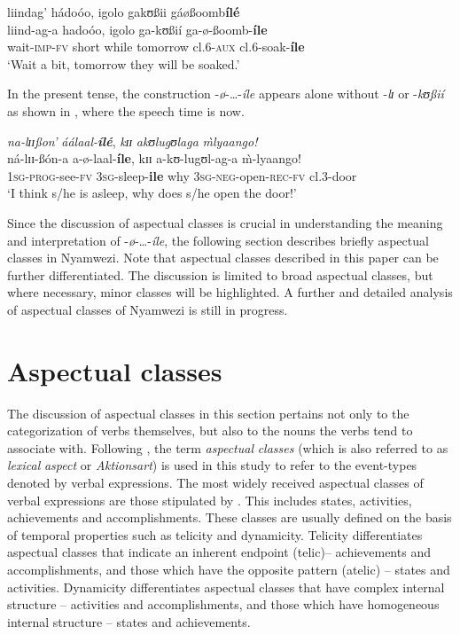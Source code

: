 \documentclass[output=paper,newtxmath,modfonts,nonflat,draftmode]{langsci/langscibook}
\begin{document}
\ea \label{ex:kanijo:6}
\glll liindag’        hádoóo,      igolo         gakʊßii   gáøßoomb\textbf{ílé}\\
liind-ag-a     hadoóo,      igolo         ga-kʊßií  ga-ø-ßoomb-\textbf{íle}\\
wait-\textsc{imp}-\textsc{fv} short while tomorrow cl.\textsc{6-aux} cl.\textsc{6}-soak-\textbf{íle}\\
\glt ‘Wait a bit, tomorrow they will be soaked.’
\z


In the present tense, the construction -\textit{ø}-\ldots-\textit{íle} appears alone without -\textit{l}{\textit{ɪ}} or -\textit{kʊßií} as shown in , where the speech time is now. 

\ea \label{ex:kanijo:7}
\glll \textit{na-lɪɪ}\textit{ßon’}           \textit{áálaal-}\textbf{\textit{ílé}},    \textit{k}{\textit{ɪɪ}} \textit{akʊ}\textit{lugʊlaga}              \textit{\`{m}lyaango!}\\
ná-lɪɪ-ßón-a           a-ø-laal-\textbf{íle},   kɪɪ  a-kʊ-lugʊl-ag-a            \`{m}-lyaango!\\
\textsc{1sg}-\textsc{prog}-see-\textsc{fv} \textsc{3sg}-sleep-\textbf{ile} why \textsc{3sg}-\textsc{neg}-open-\textsc{rec}-\textsc{fv} cl.3-door\\
\glt ‘I think s/he is asleep, why does s/he open the door!’
\z

Since the discussion of aspectual classes is crucial in understanding the meaning and interpretation of -\textit{ø}-…-\textit{íle}, the following section describes briefly aspectual classes in Nyamwezi. Note that aspectual classes described in this paper can be further differentiated. The discussion is limited to broad aspectual classes, but where necessary, minor classes will be highlighted. A further and detailed analysis of aspectual classes of Nyamwezi is still in progress. 


\section{Aspectual classes}
\label{sec:kanijo:3}

The discussion of aspectual classes in this section pertains not only to the categorization of verbs themselves, but also to the nouns the verbs tend to associate with. Following \citet[1]{Rothstein2004}, the term \textit{aspectual} \textit{classes} (which is also referred to as \textit{lexical} \textit{aspect} or \textit{Aktionsart}) is used in this study to refer to the event-types denoted by verbal expressions. The most widely received aspectual classes of verbal expressions are those stipulated by \citet{Vendler1957}. This includes states, activities, achievements and accomplishments. These classes are usually defined on the basis of temporal properties such as telicity and dynamicity. Telicity differentiates aspectual classes that indicate an inherent endpoint (telic)-- achievements and accomplishments, and those which have the opposite pattern (atelic) -- states and activities. Dynamicity differentiates aspectual classes that have complex internal structure -- activities and accomplishments, and those which have homogeneous internal structure -- states and achievements.
\end{document}
